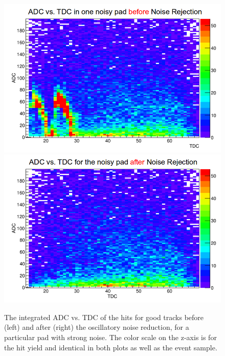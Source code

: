 \begin{figure}[tbp]
\includegraphics[scale=0.3]{fig_rtpc/noisy_pad_before_rejection.png}
\includegraphics[scale=0.3]{fig_rtpc/noisy_pad_after_rejection.png}
\caption{The integrated ADC vs. TDC of the hits for good tracks before (left) 
and after (right) the oscillatory noise reduction, for a particular pad with 
strong noise. The color scale on the z-axis is for the hit yield and identical 
in both plots as well as the event sample.}
\label{fig:Adcvstdcnoise}
\end{figure}

